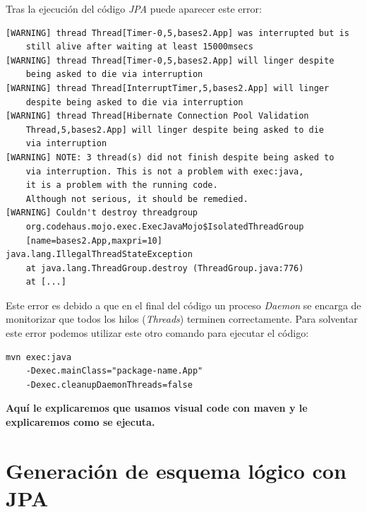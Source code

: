 \documentclass[11pt,a4paper]{article}
\begin{document}
Tras la ejecución del código \emph{JPA} puede aparecer este error:

\begin{lstlisting}
[WARNING] thread Thread[Timer-0,5,bases2.App] was interrupted but is 
	still alive after waiting at least 15000msecs
[WARNING] thread Thread[Timer-0,5,bases2.App] will linger despite 
	being asked to die via interruption
[WARNING] thread Thread[InterruptTimer,5,bases2.App] will linger 
	despite being asked to die via interruption
[WARNING] thread Thread[Hibernate Connection Pool Validation 
	Thread,5,bases2.App] will linger despite being asked to die 
	via interruption
[WARNING] NOTE: 3 thread(s) did not finish despite being asked to 
	via interruption. This is not a problem with exec:java, 
	it is a problem with the running code. 
	Although not serious, it should be remedied.
[WARNING] Couldn't destroy threadgroup 
	org.codehaus.mojo.exec.ExecJavaMojo$IsolatedThreadGroup
	[name=bases2.App,maxpri=10]
java.lang.IllegalThreadStateException
    at java.lang.ThreadGroup.destroy (ThreadGroup.java:776)
    at [...]
\end{lstlisting}

Este error es debido a que en el final del código un proceso \emph{Daemon} se encarga de monitorizar que todos los hilos (\emph{Threads}) terminen correctamente. Para solventar este error podemos utilizar este otro comando para ejecutar el código:

\begin{lstlisting}
mvn exec:java 
	-Dexec.mainClass="package-name.App" 
	-Dexec.cleanupDaemonThreads=false
\end{lstlisting}

\textbf{Aquí le explicaremos que usamos visual code con maven y le explicaremos como se ejecuta.}

\section{Generación de esquema lógico con JPA}
\end{document}
